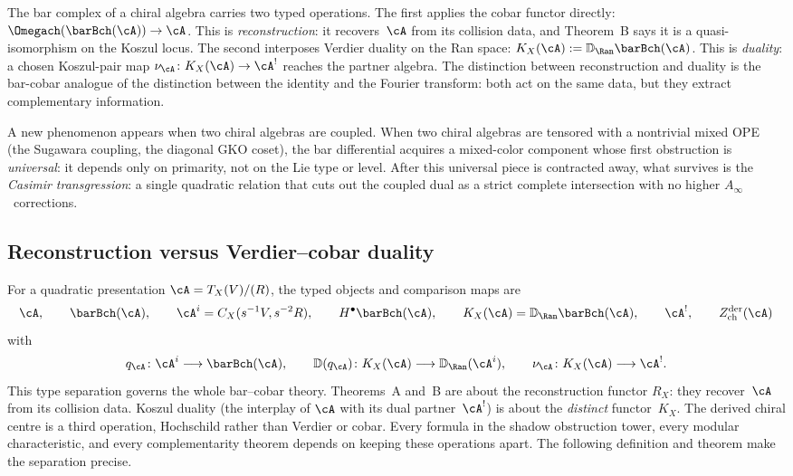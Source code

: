 The bar complex of a chiral algebra carries two typed operations.
The first applies the cobar
functor directly: $\Omegach(\barBch(\cA)) \to \cA$. This is
\emph{reconstruction}: it recovers~$\cA$ from its collision data,
and Theorem~B says it is a quasi-isomorphism on the Koszul locus.
The second interposes Verdier duality on the Ran space:
$K_X(\cA):=\mathbb{D}_{\Ran}\barBch(\cA)$. This is
\emph{duality}: a chosen Koszul-pair map
$\nu_\cA\colon K_X(\cA)\to\cA^!$ reaches the partner algebra.
The distinction between reconstruction and duality is
the bar-cobar analogue of the distinction between the identity and
the Fourier transform: both act on the same data, but they extract
complementary information.

A new phenomenon appears when two chiral algebras are coupled.
When two chiral algebras are tensored with a nontrivial mixed OPE
(the Sugawara coupling, the diagonal GKO coset), the bar differential
acquires a mixed-color component whose first obstruction is
\emph{universal}: it depends only on primarity, not on the
Lie type or level. After this universal piece is contracted away,
what survives is the \emph{Casimir transgression}: a single
quadratic relation that cuts out the coupled dual as a strict
complete intersection with no higher $A_\infty$~corrections.

\subsection{Reconstruction versus Verdier--cobar duality}
\label{subsec:reconstruction-vs-duality}

For a quadratic presentation
$\cA=T_X(V)/(R)$, the typed objects and comparison maps are
\[
\cA,\qquad
\barBch(\cA),\qquad
\cA^i=C_X(s^{-1}V,s^{-2}R),\qquad
H^\bullet\barBch(\cA),\qquad
K_X(\cA)=\mathbb D_{\Ran}\barBch(\cA),\qquad
\cA^!,\qquad
Z^{\mathrm{der}}_{\mathrm{ch}}(\cA)
\]
with
\[
q_\cA\colon\cA^i\longrightarrow\barBch(\cA),\qquad
\mathbb D(q_\cA)\colon K_X(\cA)\longrightarrow\mathbb D_{\Ran}(\cA^i),
\qquad
\nu_\cA\colon K_X(\cA)\longrightarrow\cA^!.
\]
This type separation governs the whole bar--cobar theory.
Theorems~A and~B are about the reconstruction functor $R_X$: they
recover~$\cA$ from its collision data. Koszul duality (the
interplay of $\cA$ with its dual partner~$\cA^!$) is about the
\emph{distinct} functor~$K_X$. The derived chiral centre is a third
operation, Hochschild rather than Verdier or cobar. Every formula in
the shadow obstruction tower, every modular characteristic, and every
complementarity theorem depends on keeping these operations apart. The
following definition and theorem make the separation precise.


